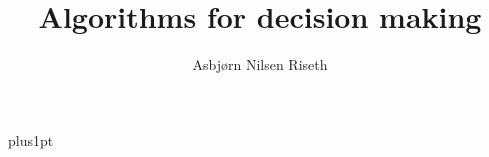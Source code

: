 \documentclass[12pt]{ociamthesis}
\title{Algorithms for decision making}
\author{Asbj{\o}rn Nilsen Riseth}
\def\biblio{}
\def\chtodolist{\listoftodos}
\begin{document}
\def\biblio{} %
\def\chtodolist{}

\baselineskip=18pt plus1pt

\setcounter{secnumdepth}{3}
\setcounter{tocdepth}{2}


{
  \thispagestyle{empty}

  \maketitle                  %
  \begin{dedication}
  \end{dedication}

  \begin{acknowledgements}
  \end{acknowledgements}

  \begin{abstract}
  \end{abstract}


}
\begin{romanpages}          %
  \listoftodos
  \tableofcontents            %
  \listoffigures              %
  \listoftables               %
\end{romanpages}            %







% 




\appendix



\end{document}
